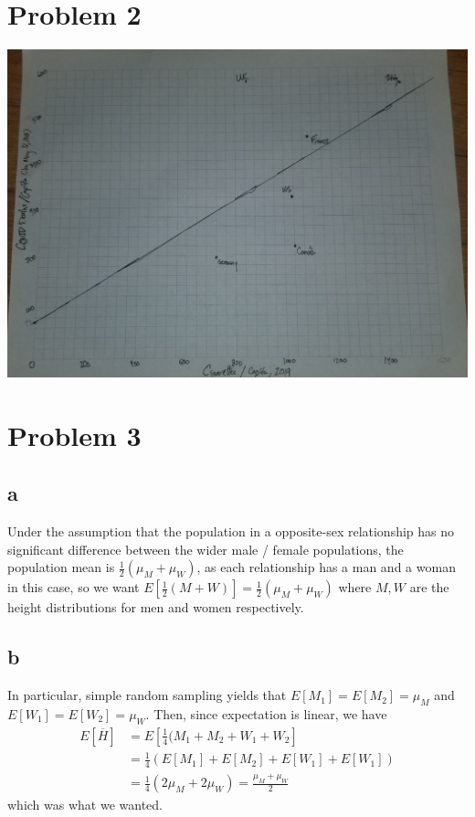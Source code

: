 \documentclass[12pt,letterpaper]{article}
\theoremstyle{definition}
\begin{document}
\section*{Problem 2}

\includegraphics[width=\textwidth]{problem2.jpg}

\section*{Problem 3}
\subsection*{a}

Under the assumption that the population in a opposite-sex relationship has no significant difference between the wider male / female populations, the population mean is $\frac{1}{2}(\mu_M + \mu_W)$, as each relationship has a man and a woman in this case, so we want $E\left[\frac{1}{2}(M + W)\right] = \frac{1}{2}(\mu_M + \mu_W)$ where $M, W$ are the height distributions for men and women respectively.

\subsection*{b}

In particular, simple random sampling yields that $E[M_1] = E[M_2] = \mu_M$ and $E[W_1] = E[W_2] = \mu_W$. Then, since expectation is linear, we have
\begin{align*}
  E[\overline{H}] &= E\left[\frac{1}{4}(M_1 + M_2 + W_1 + W_2\right] \\
                  &= \frac{1}{4}(E[M_1] + E[M_2] + E[W_1] + E[W_1]) \\
                  &= \frac{1}{4}(2\mu_M + 2\mu_W) = \frac{\mu_M + \mu_W}{2}
\end{align*}
which was what we wanted.
\end{document}
